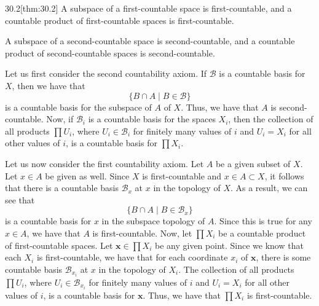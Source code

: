 \begin{thmBox}{30.2}[thm:30.2]
    A subspace of a first-countable space is first-countable, and a countable
    product of first-countable spaces is first-countable.
    
    \baseSkip

    A subspace of a second-countable space is second-countable, and a countable 
    product of second-countable spaces is second-countable.

    \baseRule

    \begin{proofBox}
        Let us first consider the second countability axiom.
        If \( \mathcal{B} \) is a countable basis for \( X \), then we have that
        \begin{equation*}
            \{ B \cap A \mid B \in \mathcal{B} \}
        \end{equation*}
        is a countable basis for the subspace of \( A \) of \( X \).
        Thus, we have that \( A \) is second-countable.
        Now, if \( \mathcal{B}_{ i } \) is a countable basis for the spaces
        \( X_{ i } \), then the collection of all products
        \( \prod U_{ i } \), where \( U_{ i } \in \mathcal{B}_{ i } \) for 
        finitely many values of \( i \) and \( U_{ i } = X_{ i } \) for all 
        other values of \( i \), is a countable basis for \( \prod X_{ i } \).

        \baseSkip

        Let us now consider the first countability axiom.
        Let \( A \) be a given subset of \( X \).
        Let \( x \in A \) be given as well.
        Since \( X \) is first-countable and \( x \in A \subset X \), it 
        follows that there is a countable basis \( \mathcal{B}_{ x } \) at
        \( x \) in the topology of \( X \).
        As a result, we can see that
        \begin{equation*}
            \{ B \cap A \mid B \in \mathcal{B}_{ x } \}
        \end{equation*}
        is a countable basis for \( x \) in the subspace topology of \( A \).
        Since this is true for any \( x \in A \), we have that \( A \) is 
        first-countable.
        Now, let \( \prod X_{ i } \) be a countable product of first-countable
        spaces.
        Let \( \mathbf{x} \in \prod X_{ i } \) be any given point.
        Since we know that each \( X_{ i } \) is first-countable, we have that
        for each coordinate \( x_{ i } \) of \( \textbf{x} \), there is some
        countable basis \( \mathcal{B}_{ x_{ i } } \) at \( x \) in the topology
        of \( X_{ i } \).
        The collection of all products \( \prod U_{ i } \), where
        \( U_{ i } \in \mathcal{B}_{ x_{ i } } \) for finitely many values of 
        \( i \) and \( U_{ i } = X_{ i } \) for all other values of \( i \), 
        is a countable basis for \( \mathbf{x} \).
        Thus, we have that \( \prod X_{ i } \) is first-countable.
    \end{proofBox}
\end{thmBox}


